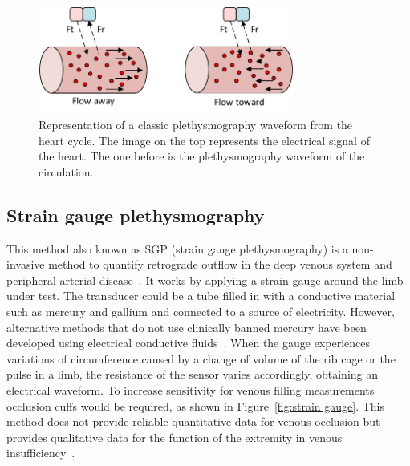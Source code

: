 \begin{figure}[!htpb]
	\centering
	\includegraphics[width=0.75\textwidth,keepaspectratio]{figure5}    
	\caption[Doppler technique to measure flow]{Representation of a classic plethysmography waveform from the heart cycle. The image on the top represents the electrical signal of the heart. The one before is the plethysmography waveform of the circulation.}
	\label{fig:Doppler method}
\end{figure}

\subsection{Strain gauge plethysmography}
\label{section literature 3.3}
This method also known as SGP (strain gauge plethysmography) is a non-invasive method to quantify retrograde outflow in the deep venous system and peripheral arterial disease~\cite{holohan1996plethysmography}. It works by applying a strain gauge around the limb under test. The transducer could be a tube filled in with a conductive material such as mercury and gallium and connected to a source of electricity. However, alternative methods that do not use clinically banned mercury have been developed using electrical conductive fluids~\cite{flowers1981strain}. When the gauge experiences variations of circumference caused by a change of volume of the rib cage or the pulse in a limb, the resistance of the sensor varies accordingly, obtaining an electrical waveform. To increase sensitivity for venous filling measurements occlusion cuffs would be required, as shown in Figure~\ref{fig:strain gauge}. This method does not provide reliable quantitative data for venous occlusion but provides qualitative data for the function of the extremity in venous insufficiency~\cite{holohan1996plethysmography}. 

